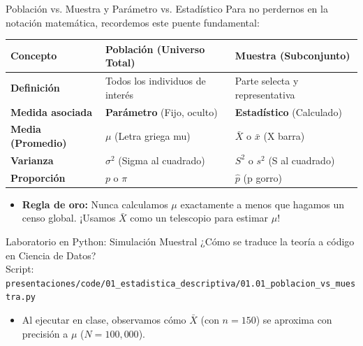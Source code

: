 \documentclass[10pt,aspectratio=169]{beamer}
\begin{document}
\begin{frame}{Población vs. Muestra y Parámetro vs. Estadístico}
  Para no perdernos en la notación matemática, recordemos este puente fundamental:
  
  \vspace{0.4em}
  \begin{center}
    \small
    \begin{tabular}{p{3.2cm} p{4.6cm} p{4.6cm}}
      \toprule
      \textbf{Concepto} & \textbf{Población (Universo Total)} & \textbf{Muestra (Subconjunto)} \\
      \midrule
      \textbf{Definición} & Todos los individuos de interés & Parte selecta y representativa \\
      \textbf{Medida asociada} & \textbf{Parámetro} (Fijo, oculto) & \textbf{Estadístico} (Calculado) \\
      \textbf{Media (Promedio)} & $\mu$ (Letra griega mu) & $\bar{X}$ o $\bar{x}$ (X barra) \\
      \textbf{Varianza} & $\sigma^2$ (Sigma al cuadrado) & $S^2$ o $s^2$ (S al cuadrado) \\
      \textbf{Proporción} & $p$ o $\pi$ & $\hat{p}$ (p gorro) \\
      \bottomrule
    \end{tabular}
  \end{center}

  \vspace{0.4em}
  \pause
  \begin{itemize}
    \item \textbf{Regla de oro:} Nunca calculamos $\mu$ exactamente a menos que hagamos un censo global. ¡Usamos $\bar{X}$ como un telescopio para estimar $\mu$!
  \end{itemize}
\end{frame}

\begin{frame}{Laboratorio en Python: Simulación Muestral}
  ¿Cómo se traduce la teoría a código en Ciencia de Datos? 
  \\ Script: \texttt{\footnotesize presentaciones/code/01\_estadistica\_descriptiva/01.01\_poblacion\_vs\_muestra.py}
  
  \vspace{0.2em}
  {\lstset{basicstyle=\ttfamily\tiny, aboveskip=0.2em, belowskip=0.2em}
  
  }

  \vspace{0.2em}
  \begin{itemize}
    \item Al ejecutar en clase, observamos cómo $\bar{X}$ (con $n=150$) se aproxima con precisión a $\mu$ ($N=100,000$).
  \end{itemize}
\end{frame}
\end{document}
